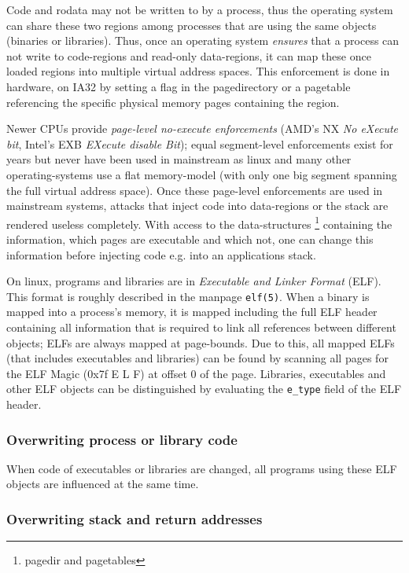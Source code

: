 Code and rodata may not be written to by a process, thus the operating system
can share these two regions among processes that are using the same objects
(binaries or libraries).  Thus, once an operating system \emph{ensures} that a
process can not write to code-regions and read-only data-regions, it can map
these once loaded regions into multiple virtual address spaces. This enforcement
is done in hardware, on IA32 by setting a flag in the pagedirectory or a
pagetable referencing the specific physical memory pages containing the region.

Newer CPUs provide \emph{page-level no-execute enforcements} (AMD's NX \emph{No
eXecute bit}, Intel's EXB \emph{EXecute disable Bit}); equal segment-level
enforcements exist for years but never have been used in mainstream as linux and
many other operating-systems use a flat memory-model (with only one big segment
spanning the full virtual address space).  Once these page-level enforcements
are used in mainstream systems, attacks that inject code into data-regions or
the stack are rendered useless completely. With access to the data-structures
\footnote{pagedir and pagetables} containing the information, which pages are
executable and which not, one can change this information before injecting code
e.g. into an applications stack. 

On linux, programs and libraries are in \emph{Executable and Linker Format}
(ELF).  This format is roughly described in the manpage \texttt{elf(5)}. When a
binary is mapped into a process's memory, it is mapped including the full ELF
header containing all information that is required to link all references
between different objects; ELFs are always mapped at page-bounds. Due to this,
all mapped ELFs (that includes executables and libraries) can be found by
scanning all pages for the ELF Magic (0x7f E L F) at offset 0 of the page.
Libraries, executables and other ELF objects can be distinguished by evaluating
the \texttt{e\_type} field of the ELF header.

\subsubsection{Overwriting process or library code}

When code of executables or libraries are changed, all programs using these ELF
objects are influenced at the same time.

\subsubsection{Overwriting stack and return addresses}




